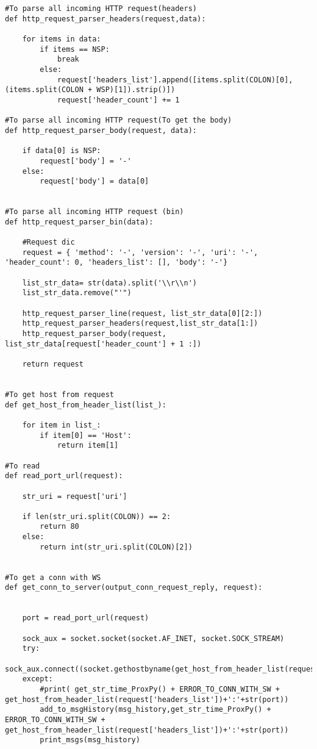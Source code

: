 \begin{verbatim}
#To parse all incoming HTTP request(headers)
def http_request_parser_headers(request,data):

    for items in data:
        if items == NSP:
            break
        else:    
            request['headers_list'].append([items.split(COLON)[0], (items.split(COLON + WSP)[1]).strip()])
            request['header_count'] += 1 

#To parse all incoming HTTP request(To get the body)
def http_request_parser_body(request, data):

    if data[0] is NSP:
        request['body'] = '-'
    else:
        request['body'] = data[0]


#To parse all incoming HTTP request (bin)
def http_request_parser_bin(data):

    #Request dic
    request = { 'method': '-', 'version': '-', 'uri': '-', 'header_count': 0, 'headers_list': [], 'body': '-'}
    
    list_str_data= str(data).split('\\r\\n')
    list_str_data.remove("'")

    http_request_parser_line(request, list_str_data[0][2:])
    http_request_parser_headers(request,list_str_data[1:])
    http_request_parser_body(request, list_str_data[request['header_count'] + 1 :])

    return request


#To get host from request
def get_host_from_header_list(list_):
    
    for item in list_:
        if item[0] == 'Host':
            return item[1]

#To read
def read_port_url(request):

    str_uri = request['uri']

    if len(str_uri.split(COLON)) == 2:
        return 80
    else:
        return int(str_uri.split(COLON)[2])


#To get a conn with WS
def get_conn_to_server(output_conn_request_reply, request):
    
  
    port = read_port_url(request)
      
    sock_aux = socket.socket(socket.AF_INET, socket.SOCK_STREAM)
    try:
        sock_aux.connect((socket.gethostbyname(get_host_from_header_list(request['headers_list'])),port))
    except:
        #print( get_str_time_ProxPy() + ERROR_TO_CONN_WITH_SW + get_host_from_header_list(request['headers_list'])+':'+str(port))
        add_to_msgHistory(msg_history,get_str_time_ProxPy() + ERROR_TO_CONN_WITH_SW + get_host_from_header_list(request['headers_list'])+':'+str(port))
        print_msgs(msg_history)
        


\end{verbatim}
